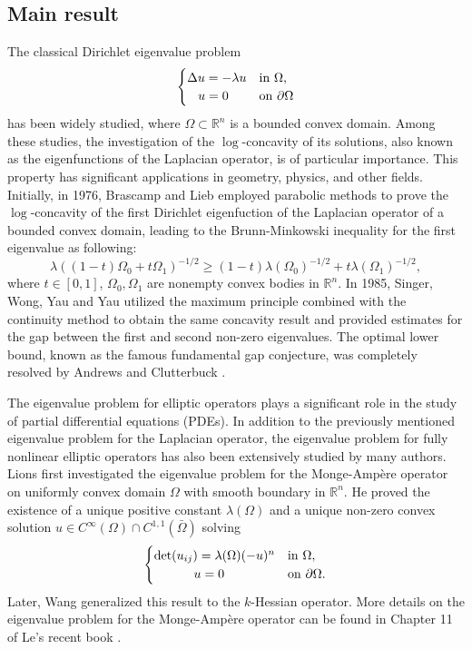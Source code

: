 \documentclass[11pt]{amsart}
\numberwithin{theorem}{section}
\numberwithin{equation}{section}
\begin{document}
\subsection{Main result}
The classical Dirichlet eigenvalue problem
\[\begin{cases}
 \Delta u=-\lambda u & \mathrm{in} \ \Omega,\\
 \hspace{3mm}u=0 & \mathrm{on} \ \partial\Omega
\end{cases}\]
has been widely studied, where $\Omega\subset\mathbb{R}^n$ is a bounded convex domain. Among these studies, the investigation of the $\log$-concavity of its solutions, also known as the  eigenfunctions of the Laplacian operator, is of particular importance. This property has significant applications in geometry, physics, and other fields. Initially, in 1976, Brascamp and Lieb \cite{Brascamp-Lieb1976} employed parabolic methods to prove the $\log$-concavity of the first Dirichlet eigenfuction of the Laplacian operator of a bounded convex domain, leading to the Brunn-Minkowski inequality for the first eigenvalue as following:
\[\lambda\left((1-t)\Omega_0+t\Omega_1\right)^{-1/2}\geq(1-t)\lambda(\Omega_0)^{-1/2}+t\lambda(\Omega_1)^{-1/2},\]
where $t\in[0,1]$, $\Omega_0, \Omega_1$ are nonempty convex bodies in $\mathbb{R}^n$. In 1985, Singer, Wong, Yau and Yau \cite{Singer-Wong-Yau-Yau1985} utilized the maximum principle combined with the continuity method to obtain the same concavity result and provided estimates for the gap between the first and second non-zero eigenvalues. The optimal lower bound, known as the famous fundamental gap conjecture, was completely resolved by Andrews and Clutterbuck \cite{Andrews-Clutterbuck2011}.

The eigenvalue problem for elliptic operators plays a significant role in the study of partial differential equations (PDEs). In addition to the previously mentioned eigenvalue problem for the Laplacian operator, the eigenvalue problem for fully nonlinear elliptic operators has also been extensively studied by many authors. Lions \cite{Lions1985} first investigated the eigenvalue problem for the Monge-Amp\`{e}re operator on uniformly convex domain $\Omega$ with smooth boundary in $\mathbb{R}^n$. He proved the existence of a unique positive constant $\lambda(\Omega)$ and a unique non-zero convex solution $u\in C^\infty(\Omega)\cap C^{1,1}(\bar{\Omega})$ solving
\[\begin{cases}
 \det (u_{ij})=\lambda(\Omega)(-u)^n & \mathrm{in}\ \Omega,\\
 \hspace{11mm}u=0 & \mathrm{on} \ \partial\Omega.
\end{cases}\]
Later, Wang \cite{Wang1994} generalized this result to the $k$-Hessian operator. More details on the eigenvalue problem for the Monge-Amp\`{e}re operator can be found in Chapter 11 of Le's recent book \cite{Le2024}.
\end{document}
